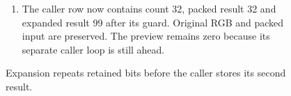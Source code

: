\begin{figure}[htbp]
\begin{minipage}{\linewidth}
\begin{enumerate}
      \item The caller row now contains count 32, packed result 32 and expanded result 99 after its guard. Original RGB and packed input are preserved. The preview remains zero because its separate caller loop is still ahead.
    \end{enumerate}
  \end{minipage}
  \caption{Expansion repeats retained bits before the caller stores its second result.}
  \label{capture:019-rgb-formats-f02}
  \label{rgb-f02}
\end{figure}
\par
